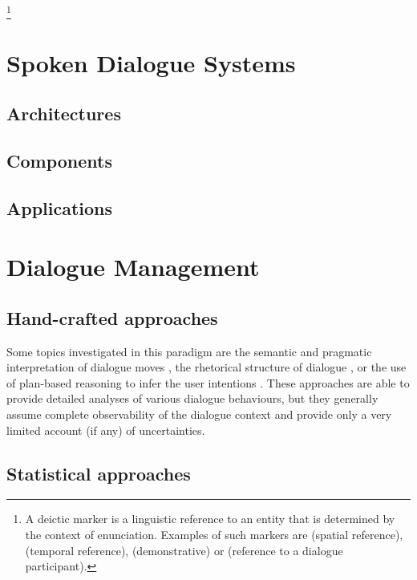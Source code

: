 \footnote{A deictic marker is a linguistic reference to an entity that is determined by the context of enunciation.  Examples of such markers are  (spatial reference),  (temporal reference),  (demonstrative) or  (reference to a dialogue participant).}


\section{Spoken Dialogue Systems}
 
\subsection{Architectures}



\subsection{Components}

\subsection{Applications}

\section{Dialogue Management}

\subsection{Hand-crafted approaches}

Some topics investigated in this paradigm are the semantic and pragmatic interpretation of dialogue moves \citep{ThomasonManuscript-THOEUA,Ginzburg2012}, the rhetorical structure of dialogue \citep{0521659515}, or the use of plan-based reasoning to infer the user intentions \citep{Allen1980,Litman87}.  These approaches are able to provide detailed analyses of various dialogue behaviours, but they generally assume complete observability of the dialogue context and provide only a very limited account (if any) of uncertainties.



\subsection{Statistical approaches}


